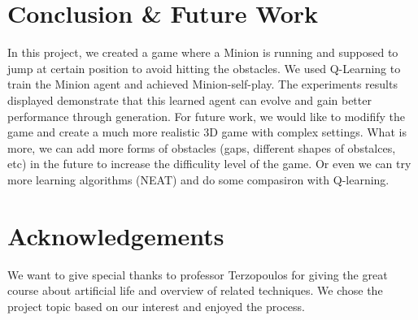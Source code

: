\documentclass{acmsiggraph}
\begin{document}
\section{Conclusion \& Future Work}
In this project, we created a game where a Minion is running and supposed to jump at certain position to avoid hitting the obstacles. We used Q-Learning to train the Minion agent and achieved Minion-self-play. The experiments results displayed demonstrate that this learned agent can evolve and gain better performance through generation. 
For future work, we would like to modifify the game and create a much more realistic 3D game with complex settings. What is more, we can add more forms of obstacles (gaps, different shapes of obstalces, etc) in the future to increase the difficulity level of the game. Or even we can try more learning algorithms (NEAT) and do some compasiron with Q-learning.


\section*{Acknowledgements}
We want to give special thanks to professor Terzopoulos for giving the great course about artificial life and overview of related techniques. We chose the project topic based on our interest and enjoyed the process.


\nocite{*}

\end{document}
